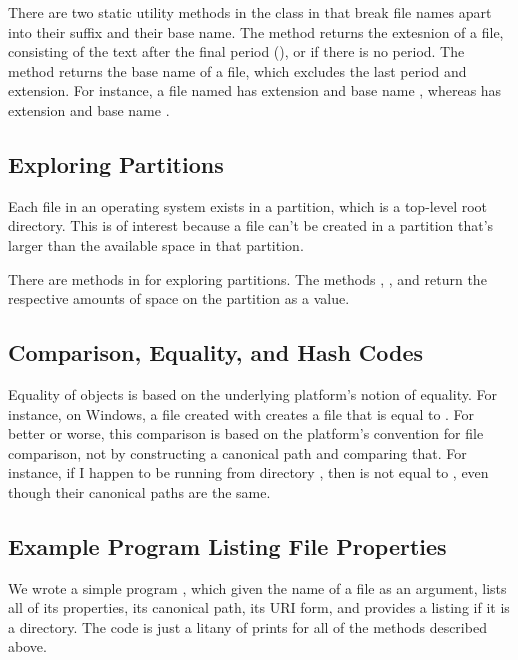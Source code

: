 There are two static utility methods in the class  in
 that break file names apart into their suffix
and their base name.  The method  returns
the extesnion of a file, consisting of the text after the final
period (), or  if there is no period.  The method
 returns the base name of a file, which excludes
the last period and extension.  For instance, a file named 
has extension  and base name , whereas 
has extension  and base name .


\subsection{Exploring Partitions}

Each file in an operating system exists in a partition, which is a
top-level root directory.  This is of interest because a file can't be
created in a partition that's larger than the available space in that
partition.

There are methods in  for exploring partitions.  The
methods , , and
 return the respective amounts of space on the
partition as a  value.


\subsection{Comparison, Equality, and Hash Codes}\label{section:io-files-equality}

Equality of  objects is based on the underlying platform's
notion of equality.  For instance, on Windows, a file created with
 creates a file that is equal to .  For better or worse, this comparison is based on the
platform's convention for file comparison, not by constructing a
canonical path and comparing that.  For instance, if I happen to
be running from directory , then 
 is not equal to 
, even though their canonical paths are
the same.


\subsection{Example Program Listing File Properties}

We wrote a simple program , which given the name
of a file as an argument, lists all of its properties, its canonical
path, its URI form, and provides a listing if it is a directory.  The
code is just a litany of prints for all of the methods described above.

